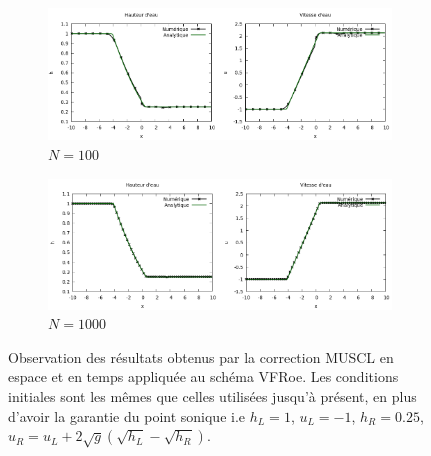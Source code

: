 \documentclass[
	french,
	11pt, %
]{fphw}
\begin{document}
\begin{figure}[H]
	\centering
	\begin{subfigure}[b]{0.8\textwidth}
		\centering
		\includegraphics[width=\textwidth]{Muscl1.png}
		\caption{$N=100$}
	\end{subfigure}
	\begin{subfigure}[b]{0.8\textwidth}
		\centering
		\includegraphics[width=\textwidth]{Muscl2.png}
		\caption{$N=1000$}
		\label{fig:Muscl2}
\end{subfigure}
	\caption{Observation des résultats obtenus par la correction MUSCL en espace et en temps appliquée au schéma VFRoe. Les conditions initiales sont les mêmes que celles utilisées jusqu'à présent, en plus d'avoir la garantie du point sonique i.e $h_L=1$, $u_L=-1$, $h_R=0.25$, $u_R = u_L + 2\sqrt{g}(\sqrt{h_L}-\sqrt{h_R})$.}
	\label{fig:Muscl}
\end{figure}
\end{document}
